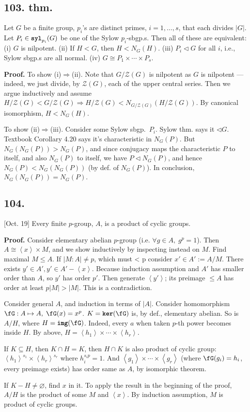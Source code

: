 \documentclass[12pt]{article}
\newcommand\X\times%
\newcommand\Ev\forall%
\newcommand\Mp\mapsto%
\newcommand{\Ip}{\Rightarrow} %
\newcommand{\Ab}[1]{ \left\langle #1 \right\rangle } %
\newcommand{\SF}[1]{ \mathscr{#1} }%
\newcommand{\Ss}[1]{\textsf{\textbf{#1}}}%
\newcommand{\Tw}[1]{\texttt{\textbf{#1}}}%
\begin{document}
\subsection*{103. thm.} Let \(G\) be a finite group, \(p_i\)'s are distinct primes, \(i=1,\dotsc,s\), that each divides \(|G|\). 
Let \(P_i \in \Tw{syl}_{p_i}(G)\) be one of the Sylow \(p_i\)-sbgp.s. 
Then all of these are equivalent: 
(i) \(G\) is nilpotent. 
(ii) If \(H < G\), then \(H < N_G(H)\). 
(iii) \(P_i \lhd G\) for all \(i\), i.e., Sylow sbgp.s are all normal. 
(iv) \(G \cong P_1 \X\dotsb\X P_s\). \par
\Ss{Proof.} To show (i)\(\Ip\)(ii). Note that \(G/\SF Z(G)\) is nilpotent as \(G\) is nilpotent --- 
indeed, we just divide, by \(\SF Z(G)\), each of the upper central series. 
Then we argue inductively and assume \(H/\SF Z(G) < G/\SF Z(G) \Ip H/\SF Z(G) < N_{G/\SF Z(G)}(H/\SF Z(G))\). 
By canonical isomorphism, \(H < N_G(H)\). \par
To show (ii)\(\Ip\)(iii). 
Consider some Sylow sbgp.\ \(P_i\). 
Sylow thm. says it \(\lhd G\). 
Textbook Corollary 4.20 says it's characteristic in \(N_G(P)\). 
But \(N_G(N_G(P)) > N_G(P)\), and since conjugacy maps the characteristic \(P\) to itself, and also \(N_G(P)\) to itself, 
we have \(P \lhd N_G(P)\), 
and hence \(N_G(P) < N_G(N_G(P))\) (by def. of \(N_G(P)\)). 
In conclusion, \(N_G(N_G(P)) = N_G(P)\). 

\subsection*{104.} [Oct. 19] Every finite \(p\)-group, \(A\), is a product of cyclic groups. \par
\Ss{Proof.} Consider elementary abelian \(p\)-group (i.e. \(\Ev g \in A,\; g^p = 1\)). 
Then \(A \cong \Ab{x} \X M\), and we show inductively by inspecting instead on \(M\). 
Find maximal \(M \leq A\). 
If \(|M:A| \neq p\), which must < p
consider \(x' \in A' := A/M\). 
There exists \(y' \in A', y' \in A' - \Ab{x}\). 
Because induction assumption and \(A'\) has smaller order than \(A\), so \(y'\) has order \(p'\). 
Then generate \(\Ab{y'}\); its preimage \(\leq A\) has order at least \(p|M| > |M|\). 
This is a contradiction. \par
Consider general \(A\), and induction in terms of \(|A|\). 
Consider homomorphism \(\fG: A \Mp A,\; \fG(x) = x^p\). 
\(K = \Tw{ker}(\fG)\) is, by def., elementary abelian. 
So is \(A/H\), where \(H = \Tw{img}(\fG)\). 
Indeed, every \(a\) when taken \(p\)-th power becomes inside \(H\). 
By above, \(H = \Ab{h_1} \X\dotsb\X \Ab{h_r}\). 
\par
If \(K \subseteq H\), then \(K \cap H = K\), 
then \(H \cap K\) is also product of cyclic group: \(\Ab{h_1}^{s_1} \X \Ab{h_r}^{s_r}\) where \(h_i^{s_i p} = 1\). 
And \(\Ab{g_1} \X\dotsb\X \Ab{g_r}\) (where \(\fG(g_i) = h_i\), every preimage exists) has order same as \(A\), by isomorphic theorem. \par
If \(K - H \neq \varnothing\), find \(x\) in it. 
To apply the result in the beginning of the proof, \(A/H\) is the product of some \(M\) and \(\Ab{x}\). 
By induction assumption, \(M\) is product of cyclic groups. 
\end{document}
